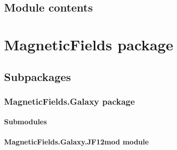 \documentclass[letterpaper,10pt,english]{sphinxmanual}
\begin{document}
\begin{fulllineitems}
\label{\detokenize{Global:Global.functions.vecRotMat}}
\pysigstartsignatures
{}
\pysigstopsignatures
\end{fulllineitems}



\subsection{Module contents}
\label{\detokenize{Global:module-Global}}\label{\detokenize{Global:module-contents}}
\sphinxstepscope


\section{MagneticFields package}
\label{\detokenize{MagneticFields:magneticfields-package}}\label{\detokenize{MagneticFields::doc}}

\subsection{Subpackages}
\label{\detokenize{MagneticFields:subpackages}}
\sphinxstepscope


\subsubsection{MagneticFields.Galaxy package}
\label{\detokenize{MagneticFields.Galaxy:magneticfields-galaxy-package}}\label{\detokenize{MagneticFields.Galaxy::doc}}

\paragraph{Submodules}
\label{\detokenize{MagneticFields.Galaxy:submodules}}

\paragraph{MagneticFields.Galaxy.JF12mod module}
\label{\detokenize{MagneticFields.Galaxy:module-MagneticFields.Galaxy.JF12mod}}\label{\detokenize{MagneticFields.Galaxy:magneticfields-galaxy-jf12mod-module}}
\end{document}
